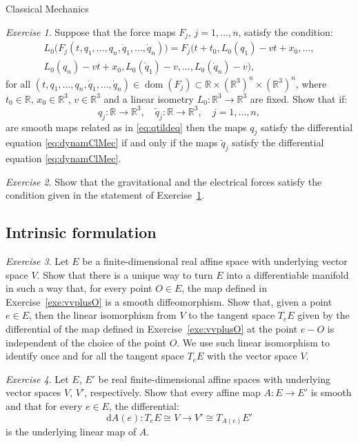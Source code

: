 \documentclass[oneside,a4paper,11pt]{amsbook}
\newcommand{\R}{\mathds R}
\newcommand{\dd}{\mathrm d}
\DeclareMathOperator{\Dom}{dom}
\theoremstyle{remark}\newtheorem{exercise}{Exercise}[chapter]
\theoremstyle{plain}\newtheorem{teo}{Theorem}[section]
\theoremstyle{plain}\newtheorem{lem}[teo]{Lemma}
\theoremstyle{plain}\newtheorem{prop}[teo]{Proposition}
\theoremstyle{plain}\newtheorem{cor}[teo]{Corollary}
\theoremstyle{definition}\newtheorem{defin}[teo]{Definition}
\theoremstyle{remark}\newtheorem{rem}[teo]{Remark}
\theoremstyle{definition}\newtheorem{notation}[teo]{Notation}
\theoremstyle{definition}\newtheorem{convention}[teo]{Convention}
\theoremstyle{definition}\newtheorem{example}[teo]{Example}
\numberwithin{section}{chapter}
\numberwithin{equation}{section}
\begin{document}
\begin{chapter}{Classical Mechanics}
\begin{exercise}\label{exe:condForce}
Suppose that the force maps $F_j$, $j=1,\ldots,n$, satisfy the condition:
\begin{multline*}
L_0\big(F_j(t,q_1,\ldots,q_n,\dot q_1,\ldots,\dot q_n)\big)=F_j\big(t+t_0,L_0(q_1)-vt+x_0,\ldots,\\
L_0(q_n)-vt+x_0,L_0(\dot q_1)-v,\ldots,L_0(\dot q_n)-v\big),
\end{multline*}
for all $(t,q_1,\ldots,q_n,\dot q_1,\ldots,\dot q_n)\in\Dom(F_j)\subset\R\times(\R^3)^n\times(\R^3)^n$,
where $t_0\in\R$, $x_0\in\R^3$, $v\in\R^3$ and a linear isometry $L_0:\R^3\to\R^3$ are fixed. Show that if:
\[q_j:\R\longrightarrow\R^3,\quad\tilde q_j:\R\longrightarrow\R^3,\quad j=1,\ldots,n,\]
are smooth maps related as in \eqref{eq:qtildeq} then the maps $q_j$ satisfy the differential equation
\eqref{eq:dynamClMec} if and only if the maps $\tilde q_j$ satisfy the differential equation \eqref{eq:dynamClMec}.
\end{exercise}

\begin{exercise}\label{exe:condForcesat}
Show that the gravitational and the electrical forces satisfy the condition given in the statement
of Exercise~\ref{exe:condForce}.
\end{exercise}

\subsection*{Intrinsic formulation}

\begin{exercise}\label{exe:affspacemanifold}
Let $E$ be a finite-dimensional real affine space with underlying vector space $V$. Show that there is a unique
way to turn $E$ into a differentiable manifold in such a way that, for every point $O\in E$, the map defined
in Exercise~\ref{exe:vvplusO} is a smooth diffeomorphism. Show that, given a point $e\in E$,
then the linear isomorphism from $V$ to the tangent
space $T_eE$ given by the differential of the map defined in Exercise~\ref{exe:vvplusO} at the point $e-O$ is independent of the choice
of the point $O$. We use such linear isomorphism to identify once and for all the tangent space $T_eE$ with the vector space
$V$.
\end{exercise}

\begin{exercise}\label{exe:affinesmooth}
Let $E$, $E'$ be real finite-dimensional affine spaces with underlying vector spaces $V$, $V'$, respectively.
Show that every affine map $A:E\to E'$ is smooth and that for every $e\in E$, the differential:
\[\dd A(e):T_eE\cong V\longrightarrow V'\cong T_{A(e)}E'\]
is the underlying linear map of $A$.
\end{exercise}


\end{chapter}
\end{document}
